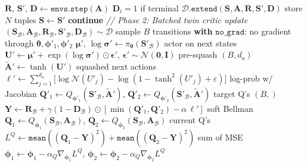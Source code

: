 \documentclass[11pt]{article}
\begin{document}
\begin{algorithm}[p]
\begin{minipage}[t]{0.68\linewidth}
\begin{algorithmic}[1]
    \EndIf
    \State $\mathbf{R},\, \mathbf{S}',\, \mathbf{D} \gets \texttt{envs.step}(\mathbf{A})$ \hfill $\mathbf{D}_i = 1$ if terminal
    \State $\mathcal{D}.\texttt{extend}(\mathbf{S}, \mathbf{A}, \mathbf{R}, \mathbf{S}', \mathbf{D})$ \hfill store $N$ tuples
    \State $\mathbf{S} \gets \mathbf{S}'$
     \textbf{continue} \EndIf
    \Statex \hspace{\algorithmicindent}\textit{// Phase 2: Batched twin critic update}
    \State $(\mathbf{S}_\mathcal{B}, \mathbf{A}_\mathcal{B}, \mathbf{R}_\mathcal{B}, \mathbf{S}'_\mathcal{B}, \mathbf{D}_\mathcal{B}) \sim \mathcal{D}$ \hfill sample $B$ transitions
    \State \textbf{with} $\texttt{no\_grad}$: \hfill no gradient through $\boldsymbol{\theta}, \boldsymbol{\phi}'_1, \boldsymbol{\phi}'_2$
    \State \hspace{\algorithmicindent} $\boldsymbol{\mu}',\, \log\boldsymbol{\sigma}' \gets \pi_{\boldsymbol{\theta}}(\mathbf{S}'_\mathcal{B})$ \hfill actor on next states
    \State \hspace{\algorithmicindent} $\mathbf{U}' \gets \boldsymbol{\mu}' + \exp(\log\boldsymbol{\sigma}') \odot \boldsymbol{\epsilon}'$, \;\; $\boldsymbol{\epsilon}' \sim \mathcal{N}(\mathbf{0}, \mathbf{I})$ \hfill pre-squash $(B, d_a)$
    \State \hspace{\algorithmicindent} $\tilde{\mathbf{A}}' \gets \tanh(\mathbf{U}')$ \hfill squashed next actions
    \State \hspace{\algorithmicindent} $\boldsymbol{\ell}' \gets \!\sum_{j=1}^{d_a}\!\big[\log\mathcal{N}(U'_j) - \log(1 {-} \tanh^2\!(U'_j) {+} \varepsilon)\big]$ \hfill log-prob w/ Jacobian
    \State \hspace{\algorithmicindent} $\mathbf{Q}'_1 \gets Q_{\boldsymbol{\phi}'_1}(\mathbf{S}'_\mathcal{B}, \tilde{\mathbf{A}}')$, \;\; $\mathbf{Q}'_2 \gets Q_{\boldsymbol{\phi}'_2}(\mathbf{S}'_\mathcal{B}, \tilde{\mathbf{A}}')$ \hfill target Q's $(B,)$
    \State \hspace{\algorithmicindent} $\mathbf{Y} \gets \mathbf{R}_\mathcal{B} + \gamma(1 {-} \mathbf{D}_\mathcal{B}) \odot [\min(\mathbf{Q}'_1, \mathbf{Q}'_2) - \alpha\,\boldsymbol{\ell}']$ \hfill soft Bellman
    \State $\mathbf{Q}_1 \gets Q_{\boldsymbol{\phi}_1}(\mathbf{S}_\mathcal{B}, \mathbf{A}_\mathcal{B})$, \;\; $\mathbf{Q}_2 \gets Q_{\boldsymbol{\phi}_2}(\mathbf{S}_\mathcal{B}, \mathbf{A}_\mathcal{B})$ \hfill current Q's
    \State $L^Q \gets \texttt{mean}((\mathbf{Q}_1 {-} \mathbf{Y})^2) + \texttt{mean}((\mathbf{Q}_2 {-} \mathbf{Y})^2)$ \hfill sum of MSE
    \State $\boldsymbol{\phi}_1 \gets \boldsymbol{\phi}_1 - \alpha_Q \nabla_{\boldsymbol{\phi}_1} L^Q$, \;\; $\boldsymbol{\phi}_2 \gets \boldsymbol{\phi}_2 - \alpha_Q \nabla_{\boldsymbol{\phi}_2} L^Q$

\end{algorithmic}
\end{minipage}
\end{algorithm}
\end{document}
